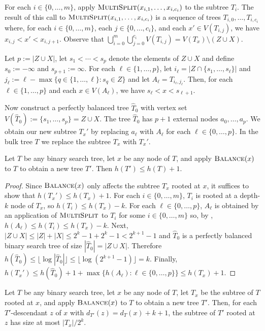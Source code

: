 \documentclass[kpfonts]{patmorin}
\let\le\leqslant
\begin{document}
For each $i\in\{0,\ldots,m\}$, apply $\textsc{MultiSplit}(x_{i,1},\ldots,x_{i,c_i})$ to the subtree $T_i$.  The result of this call to $\textsc{MultiSplit}(x_{i,1},\ldots,x_{i,c_i})$ is a sequence of trees $T_{i,0},\ldots,T_{i,c_i}$ where, for each $i\in\{0,\ldots,m\}$, each $j\in\{0,\ldots,c_i\}$, and each $x'\in V(T_{i,j})$, we have $x_{i,j}<x'<x_{i,j+1}$.  Observe that $\bigcup_{i=0}^m\bigcup_{j=0}^{c_i} V(T_{i,j}) = V(T_x)\setminus (Z\cup X)$.

Let $p:=|Z\cup X|$, let $s_1<\cdots< s_p$ denote the elements of $Z\cup X$ and define $s_0:=-\infty$ and $s_{p+1}:=\infty$.  For each $\ell\in\{1,\ldots,p\}$, let $i_\ell=|Z\cap \{s_1,\ldots,s_\ell\}|$ and $j_\ell:= \ell - \max\{ q\in\{1,\ldots,\ell\}: s_q\in Z\}$ and let $A_\ell=T_{i_\ell,j_\ell}$.   Then, for each $\ell\in \{1,\ldots,p\}$ and each $x\in V(A_\ell)$, we have $s_\ell < x < s_{\ell+1}$.

Now construct a perfectly balanced tree $\hat{T}_0$ with vertex set $V(\hat{T}_0):=\{s_1,\ldots,s_p\}=Z\cup X$.  The tree $\hat{T}_0$ has $p+1$ external nodes $a_0,\ldots,a_p$.  We obtain our new subtree $T_x'$ by replacing $a_\ell$ with $A_\ell$ for each $\ell\in\{0,\ldots,p\}$.  In the bulk tree $T$ we replace the subtree $T_x$ with $T_x'$.

\begin{lem}
  Let $T$ be any binary search tree, let $x$ be any node of $T$, and apply $\textsc{Balance}(x)$ to $T$ to obtain a new tree $T'$.  Then $h(T')\le h(T)+1$.
\end{lem}

\begin{proof}
  Since $\textsc{Balance}(x)$ only affects the subtree $T_x$ rooted at $x$, it suffices to show that $h(T_x')\le h(T_x)+1$.  For each $i\in\{0,\ldots, m\}$, $T_i$ is rooted at a depth-$k$ node of $T_x$, so $h(T_i)\le h(T_x)-k$. For each $\ell \in\{0,\ldots,p\}$, $A_\ell$ is obtained by an application of $\textsc{MultiSplit}$ to $T_i$ for some $i\in\{0,\ldots,m\}$ so, by , $h(A_\ell)\le h(T_i)\le h(T_x)-k$.  Next, $|Z\cup X|\le |Z|+|X| \le 2^k-1 + 2^k-1 < 2^{k+1}-1$ and $\hat{T}_0$ is a perfectly balanced binary search tree of size $|\hat{T}_0|=|Z\cup X|$.  Therefore $h(\hat{T}_0)\le \lfloor\log|\hat{T}_0|\rfloor\le \lfloor\log(2^{k+1}-1)\rfloor = k$.  Finally, $h(T_x')\le h(\hat{T}_0)+1 +\max \{h(A_\ell):\ell\in\{0,\ldots,p\}\} \le h(T_x)+1$.  
\end{proof}

\begin{lem}
  Let $T$ be any binary search tree, let $x$ be any node of $T$, let $T_x$ be the subtree of $T$ rooted at $x$, and apply $\textsc{Balance}(x)$ to $T$ to obtain a new tree $T'$.  Then, for each $T'$-descendant $z$ of $x$ with $d_{T'}(z)=d_{T}(x)+k+1$, the subtree of $T'$ rooted at $z$ has size at most $|T_x|/2^k$.
\end{lem}
\end{document}
